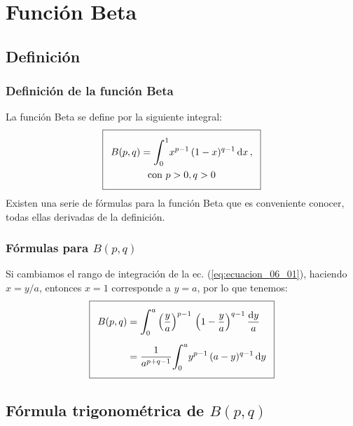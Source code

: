 \documentclass[12pt]{beamer}
\begin{document}
\section{Función Beta}
\subsection{Definición}

\begin{frame}[fragile]
\frametitle{Definición de la función Beta}
La función Beta se define por la siguiente integral:
\begin{align} \addtolength{\fboxsep}{5pt}\boxed{
\begin{gathered}
B (p, q) = \scaleint{6ex}_{\bs 0}^{1} x^{p-1} \, (1- x )^{q-1} \dd{x}, \\
\mbox{con }  p > 0, q > 0
\end{gathered}
}
\label{eq:ecuacion_06_01}
\end{align}
\pause
Existen una serie de fórmulas para la función Beta que es conveniente conocer, todas ellas derivadas de la definición.
\end{frame}
\begin{frame}
\frametitle{Fórmulas para $B(p, q)$}
Si cambiamos el rango de integración de la ec. (\ref{eq:ecuacion_06_01}), haciendo $x = y/a$, entonces $x = 1$ corresponde a $y = a$, por lo que tenemos:
\pause
\begin{align} \addtolength{\fboxsep}{5pt}\boxed{
\begin{aligned}
B (p, q) &= \scaleint{6ex}_{\bs 0}^{a} \left( \dfrac{y}{a}\right)^{p-1} \, \left( 1 - \dfrac{y}{a}\right)^{q-1} \dfrac{\dd{y}}{a} \\[0.5em]
&= \dfrac{1}{a^{p+q-1}} \scaleint{6ex}_{\bs 0}^{a} y^{p-1} \, (a - y)^{q-1} \dd{y}
\end{aligned}
\label{eq:ecuacion_06_03}
}
\end{align}
\end{frame}

\subsection{Fórmula trigonométrica de \texorpdfstring{$B (p,q)$}{B (p, q)}}
\end{document}
